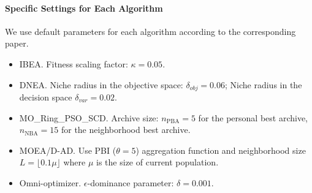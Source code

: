 \documentclass[conference]{IEEEtran}
\begin{document}
\paragraph{Specific Settings for Each Algorithm}
We use default parameters for each algorithm according to the corresponding paper.
\begin{itemize}
    \item IBEA. Fitness scaling factor: $\kappa=0.05$.
    \item DNEA. Niche radius in the objective space: $\delta_{obj}=0.06$; Niche radius in the decision space $\delta_{var}=0.02$.
    \item MO\_Ring\_PSO\_SCD. Archive size: $n_{\text{PBA}}=5$ for the personal best archive, $n_{\text{NBA}}=15$ for the neighborhood best archive.
    \item MOEA/D-AD. Use PBI ($\theta=5$) aggregation function and neighborhood size $L = \lfloor 0.1\mu \rfloor$ where $\mu$ is the size of current population.
    \item Omni-optimizer. $\epsilon$-dominance parameter: $\delta=0.001$.
\end{itemize}
\end{document}
